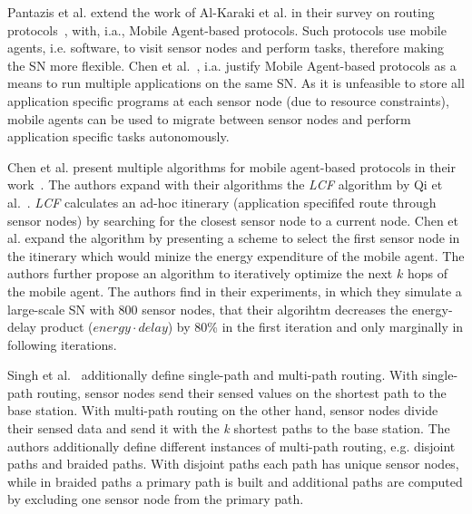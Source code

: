 Pantazis et al. extend the work of Al-Karaki et al. in their survey on routing
protocols~\cite{pantazis2013energy}, with, i.a., Mobile Agent-based protocols.
Such protocols use mobile agents, i.e. software, to visit sensor nodes and
perform tasks, therefore making the \ac{SN} more flexible. Chen et
al.~\cite{chen2007applications}, i.a. justify Mobile Agent-based protocols as a
means to run multiple applications on the same \ac{SN}. As it is unfeasible to
store all application specific programs at each sensor node (due to resource
constraints), mobile agents can be used to migrate between sensor nodes and
perform application specific tasks autonomously.

Chen et al. present multiple algorithms for mobile agent-based protocols in
their work~\cite{chen2011itinerary}. The authors expand with their algorithms
the \textit{LCF} algorithm by Qi et al.~\cite{qi2001optimal}. \textit{LCF}
calculates an ad-hoc itinerary (application specififed route through sensor
nodes) by searching for the closest sensor node to a current node. Chen et al.
expand the algorithm by presenting a scheme to select the first sensor node in
the itinerary which would minize the energy expenditure of the mobile agent.
The authors further propose an algorithm to iteratively optimize the next $ k $
hops of the mobile agent. The authors find in their experiments, in which they
simulate a large-scale \ac{SN} with 800 sensor nodes, that their algorihtm
decreases the energy-delay product ($ energy \cdot delay $) by 80\% in the first
iteration and only marginally in following iterations.

Singh et al.~\cite{singh2010routing} additionally define single-path and
multi-path routing. With single-path routing, sensor nodes send their sensed
values on the shortest path to the base station. With multi-path routing on the
other hand, sensor nodes divide their sensed data and send it with the
\textit{k} shortest paths to the base station. The authors additionally define
different instances of multi-path routing, e.g. disjoint paths and braided
paths. With disjoint paths each path has unique sensor nodes, while in braided paths a primary path is built and additional paths are computed by excluding
one sensor node from the primary path.

